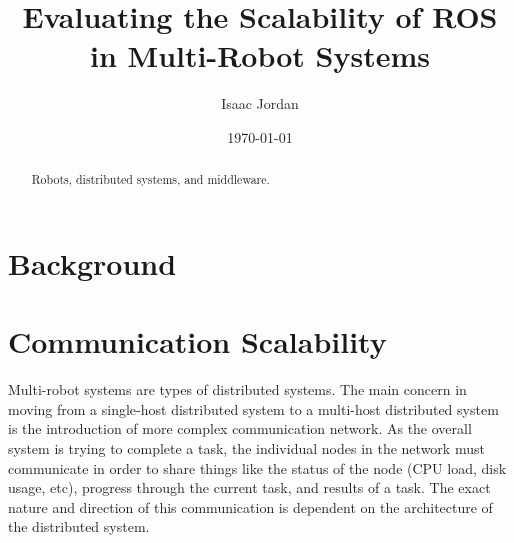 \documentclass{l4proj}
\begin{document}
\title{Evaluating the Scalability of ROS in Multi-Robot Systems}
\author{Isaac Jordan}
\date{\today}
\maketitle

\begin{abstract}
Robots, distributed systems, and middleware.
\end{abstract}

\educationalconsent
%
%
\tableofcontents

\pagebreak
{}




\chapter{Background}
\label{background-chapter}









\chapter{Communication Scalability}
\label{communication-chapter}

Multi-robot systems are types of distributed systems. The main concern in moving from a single-host distributed system to a multi-host distributed system is the introduction of more complex communication network. As the overall system is trying to complete a task, the individual nodes in the network must communicate in order to share things like the status of the node (CPU load, disk usage, etc), progress through the current task, and results of a task. The exact nature and direction of this communication is dependent on the architecture of the distributed system.
\end{document}
